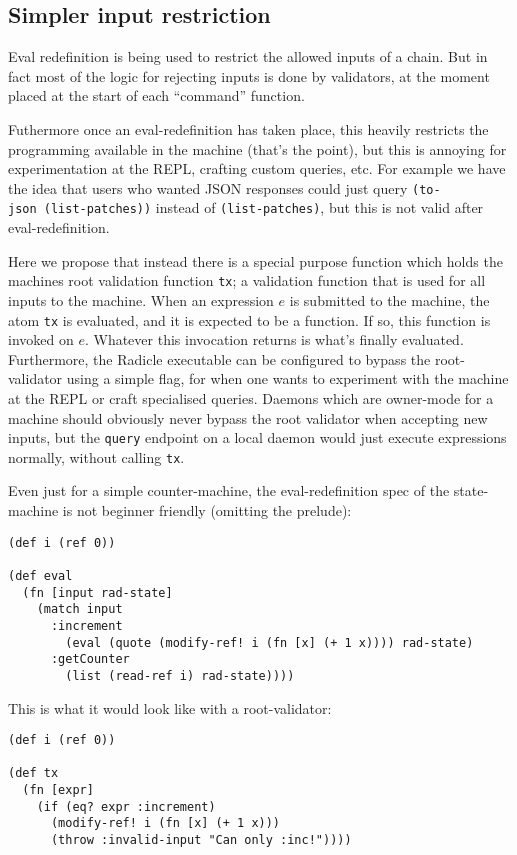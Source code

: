 \documentclass[a4paper, oneside, 10pt]{amsart}
\begin{document}
\subsection{Simpler input restriction}\label{simpler-input-restriction}

Eval redefinition is being used to restrict the allowed inputs of a chain. But
in fact most of the logic for rejecting inputs is done by validators, at the
moment placed at the start of each ``command'' function.

Futhermore once an eval-redefinition has taken place, this heavily restricts the
programming available in the machine (that's the point), but this is annoying
for experimentation at the REPL, crafting custom queries, etc. For example we
have the idea that users who wanted JSON responses could just query
\texttt{(to-json\ (list-patches))} instead of \texttt{(list-patches)}, but this
is not valid after eval-redefinition.

Here we propose that instead there is a special purpose function which holds the
machines root validation function \texttt{tx}; a validation function that is
used for all inputs to the machine. When an expression $e$ is submitted to the
machine, the atom \texttt{tx} is evaluated, and it is expected to be a
function. If so, this function is invoked on $e$. Whatever this invocation
returns is what's finally evaluated. Furthermore, the Radicle executable can be
configured to bypass the root-validator using a simple flag, for when one wants
to experiment with the machine at the REPL or craft specialised queries. Daemons
which are owner-mode for a machine should obviously never bypass the root
validator when accepting new inputs, but the \texttt{query} endpoint on a local
daemon would just execute expressions normally, without calling \texttt{tx}.

Even just for a simple counter-machine, the eval-redefinition spec of the
state-machine is not beginner friendly (omitting the prelude):
\begin{lstlisting}
(def i (ref 0))

(def eval
  (fn [input rad-state]
    (match input
      :increment
        (eval (quote (modify-ref! i (fn [x] (+ 1 x)))) rad-state)
      :getCounter
        (list (read-ref i) rad-state))))
\end{lstlisting}

This is what it would look like with a root-validator:
\begin{lstlisting}
(def i (ref 0))

(def tx
  (fn [expr]
    (if (eq? expr :increment)
      (modify-ref! i (fn [x] (+ 1 x)))
      (throw :invalid-input "Can only :inc!"))))
\end{lstlisting}
\end{document}
